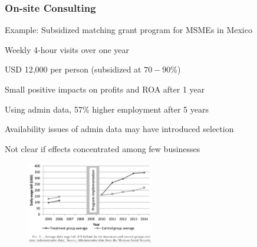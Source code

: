 \documentclass[hideothersubsections, usenames,dvipsnames,11pt]{beamer}
\newenvironment{itemize_2pt}{\itemize\addtolength{\itemsep}{2pt}}{\enditemize}
\begin{document}
\begin{frame}
\frametitle{On-site Consulting}

Example: Subsidized matching grant program for MSMEs in Mexico \citep{Bruhn2018}
\begin{itemize_2pt}

	\item Weekly 4-hour visits over one year
	\item USD 12,000 per person (subsidized at $70-90\%$)
	\item \textcolor{bdf}{Small positive impacts on profits and ROA after 1 year}
	

	\vspace{0.5em}	
	
	\item Using admin data, \textcolor{bdf}{57\% higher employment after 5 years}
	\begin{itemize_2pt}
		\item Availability issues of admin data may have introduced selection
		\item Not clear if effects concentrated among few businesses
	\end{itemize_2pt}
\end{itemize_2pt}

\begin{figure}[htbp]
	\centering
	\includegraphics[width=15em]{pics/Bruhn2018_consult.png}
	\label{Bruhn (2018): Consulting}
\end{figure}


\end{frame}

\end{document}
